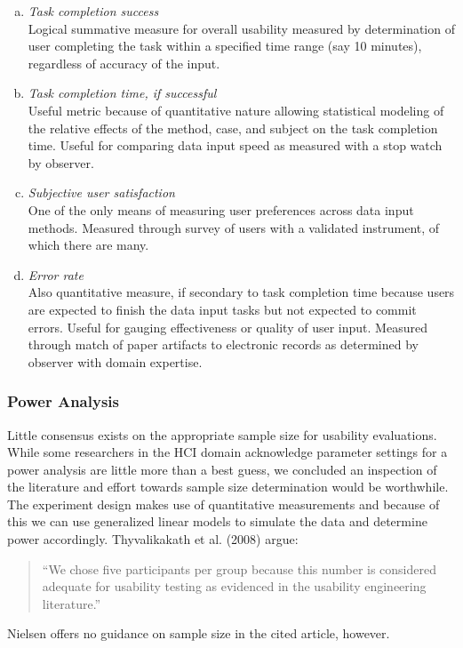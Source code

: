 \documentclass[11pt]{article}
\begin{document}
\begin{enumerate}[(a)]
\item{\textit{Task completion success}}\\
Logical summative measure for overall usability measured by determination of user completing the task within a specified time range (say 10 minutes), regardless of accuracy of the input.

\item{\textit{Task completion time, if successful}}\\
Useful metric because of quantitative nature allowing statistical modeling of the relative effects of the method, case, and subject on the task completion time. Useful for comparing data input speed as measured with a stop watch by observer.

\item{\textit{Subjective user satisfaction}}\\
One of the only means of measuring user preferences across data input methods. Measured through survey of users with a validated instrument, of which there are many\cite{Chin1998Development-of-, Sittig1999Evaluating-phys, Wixom:2005fk, Han:2004uq,Kettinger:1994vn,Aladwani:2002kx}.

\item{\textit{Error rate}}\\
Also quantitative measure, if secondary to task completion time because users are expected to finish the data input tasks but not expected to commit errors. Useful for gauging effectiveness or quality of user input. Measured through match of paper artifacts to electronic records as determined by observer with domain expertise.
\end{enumerate}




\subsubsection{Power Analysis}

Little consensus exists on the appropriate sample size for usability evaluations\cite{Virzi:1992ve,Lewis:1994ly,Turner:2006zr,Nielsen:1993ys}. While some researchers in the HCI domain acknowledge parameter settings for a power analysis are little more than a best guess, we concluded an inspection of the literature and effort towards sample size determination would be worthwhile. The experiment design makes use of quantitative measurements and because of this we can use generalized linear models to simulate the data and determine power accordingly. Thyvalikakath et al. (2008) argue:
\begin{quote}
\small{``We chose five participants per group because this number is considered adequate for usability testing as evidenced in the usability engineering literature\cite{Nielsen1994Enhancing-the-e}.''}
\end{quote}
\noindent Nielsen offers no guidance on sample size in the cited article, however. 
\end{document}
